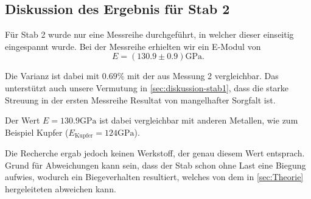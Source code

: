 \subsection{Diskussion des Ergebnis für Stab 2}
\label{sec:diskussion-stab2}

Für Stab 2 wurde nur eine Messreihe durchgeführt, in welcher dieser einseitig eingespannt wurde.
Bei der Messreihe erhielten wir ein E-Modul von
\begin{equation}
	E = (130.9 \pm 0.9) \si{\giga\pascal}.
	\label{eqn:emodul2}
\end{equation}

Die Varianz ist dabei mit $0.69\%$ mit der aus Messung 2 vergleichbar. 
Das unterstützt auch unsere Vermutung in \autoref{sec:diskussion-stab1}, dass 
die starke Streuung in der ersten Messreihe Resultat von mangelhafter 
Sorgfalt ist.

Der Wert $E = 130.9 \si{\giga\pascal}$ ist dabei vergleichbar mit anderen Metallen, wie zum
Beispiel Kupfer ($E_\text{Kupfer} = 124 \si{\giga\pascal}$\cite{MaWi}).

Die Recherche ergab jedoch keinen Werkstoff, der genau diesem Wert entsprach. Grund für 
Abweichungen kann sein, dass der Stab schon ohne Last eine Biegung aufwies, wodurch ein 
Biegeverhalten resultiert, welches von dem in \autoref{sec:Theorie} hergeleiteten
abweichen kann.
